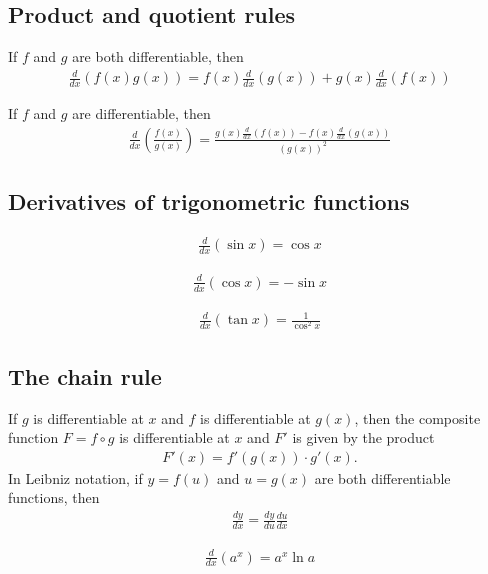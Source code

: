 \documentclass{article}
\begin{document}
\subsection{Product and quotient rules}
\begin{theorem}
    If $f$ and $g$ are both differentiable, then
    \begin{align*}
        \frac{d}{dx}(f(x)g(x))=f(x)\frac{d}{dx}(g(x))+g(x)\frac{d}{dx}(f(x))
    \end{align*}
\end{theorem}
\begin{theorem}
    If $f$ and $g$ are differentiable, then
    \begin{align*}
        \frac{d}{dx}\left(\frac{f(x)}{g(x)}\right)=\frac{g(x)\frac{d}{dx}(f(x))-f(x)\frac{d}{dx}(g(x))}{(g(x))^2}
    \end{align*}
\end{theorem}
\subsection{Derivatives of trigonometric functions}
\begin{theorem}
    \begin{align*}
        \frac{d}{dx}(\sin x)=\cos x
    \end{align*}
\end{theorem}
\begin{theorem}
    \begin{align*}
        \frac{d}{dx}(\cos x)=-\sin x
    \end{align*}
\end{theorem}
\begin{theorem}
    \begin{align*}
        \frac{d}{dx}(\tan x)=\frac{1}{\cos^2 x}
    \end{align*}
\end{theorem}
\subsection{The chain rule}
\begin{theorem}
    If $g$ is differentiable at $x$ and $f$ is differentiable at $g(x)$, then the composite function $F=f\circ g$ is differentiable at $x$ and $F'$ is given by the product
    \begin{align*}
        F'(x)=f'(g(x))\cdot g'(x).
    \end{align*}
    In Leibniz notation, if $y=f(u)$ and $u=g(x)$ are both differentiable functions, then
    \begin{align*}
        \frac{dy}{dx}=\frac{dy}{du}\frac{du}{dx}
    \end{align*}
\end{theorem}
\begin{theorem}
    \begin{align*}
        \frac{d}{dx}(a^x)=a^x\ln a
    \end{align*}
\end{theorem}
\end{document}
